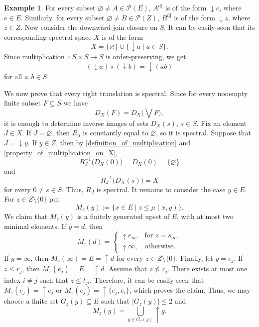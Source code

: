 \documentclass[10pt, reqno]{amsart}
\theoremstyle{plain}
\theoremstyle{definition}
\newtheorem{example}[theorem]{Example}
\begin{document}
\begin{example}
    For every subset $\varnothing \neq A \in \mathcal{P}(E)$, $A^{\mathrm{dj}}$ is of the form $\downarrow e$, where $e \in E$. Similarly, for every subset $\varnothing \neq B \in \mathcal{P}(Z)$, $B^\mathrm{dj}$ is of the form $\downarrow z$, where $z\in Z$. Now consider the downward-join closure on $S$. It can be easily seen that its corresponding spectral space $X$ is of the form $$X = \{\varnothing\} \cup \{\downarrow a \mid a \in S\}.$$ Since multiplication $\cdot: S \times S \to S$ is order-preserving, we get \begin{equation}\label{property_of_multiplication_on_X}
        (\downarrow a) \star (\downarrow b) = \downarrow(ab) 
    \end{equation}
    for all $a, b \in S$. 

    We now prove that every right translation is spectral. Since for every nonempty finite subset $F \subseteq S$ we have $$D_X(F) = D_X\Big(\bigvee F\Big),$$ it is enough to determine inverse images of sets $D_X(s)$, $s\in S$. Fix an element $J \in X$. If $J = \varnothing$, then $R_J$ is constantly equal to $\varnothing$, so it is spectral. Suppose that $J = \downarrow y$. If $y \in Z$, then by \eqref{definition_of_multiplication} and \eqref{property_of_multiplication_on_X}, $$R_J^{-1}\big(D_X(0)\big) = D_X(0) = \{\varnothing\}$$ and $$R_J^{-1}\big(D_X(s)\big) = X$$ for every $0 \neq s\in S$. Thus, $R_J$ is spectral. It remains to consider the case $y\in E$. For $z \in Z \setminus\{0\}$ put $$M_z(y) := \{x \in E \mid z \leqslant \mu(x, y)\}.$$ We claim that $M_z(y)$ is a finitely generated upset of $E$, with at most two minimal elements. If $y = d$, then $$M_z(d) = \begin{cases}
        \uparrow e_m, & \text{for } z = s_m, \\
        \uparrow\infty, & \text{otherwise}. 
    \end{cases}$$ If $y = \infty$, then $M_z(\infty) = E = \uparrow d$ for every $z \in Z\setminus\{0\}$. Finally, let $y = e_j$. If~$z \leqslant r_j$, then $M_z(e_j) = E = \uparrow d$. Assume that $z \not\leqslant r_j$. There exists at most one index $i \neq j$ such that $z \leqslant t_{ji}$. Therefore, it can be easily seen that $M_z(e_j) = \uparrow e_j$ or $M_z(e_j) = \uparrow\{e_j, e_i\}$, which proves the claim. Thus, we may choose a finite set $G_z(y)\subseteq E$ such that $|G_z(y)| \leqslant 2$ and $$M_z(y) = \bigcup_{g \in G_z(y)}\uparrow g.$$


\end{example}
\end{document}
